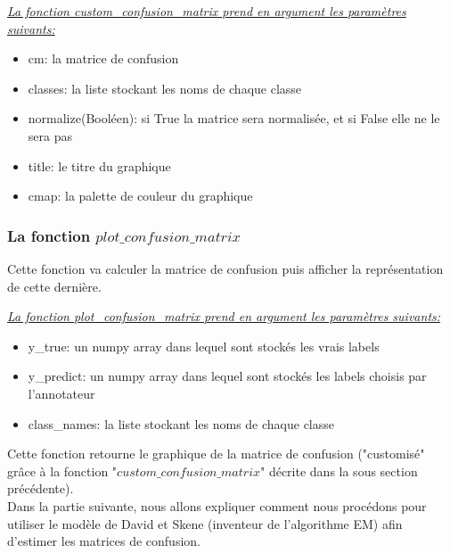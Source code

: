 \documentclass[a4paper,french,10pt]{article}
\begin{document}
	
	
	\textit{\underline{La fonction custom\_confusion\_matrix prend en argument les paramètres suivants:}}
	\vspace{2mm}
	\begin{itemize}
		\item cm: la matrice de confusion \\
		\item classes: la liste stockant les noms de chaque classe \\
		\item normalize(Booléen): si True la matrice sera normalisée, et si False elle ne le sera pas \\
		\item title: le titre du graphique \\
		\item cmap: la palette de couleur du graphique
	\end{itemize}

	\subsubsection{La fonction $plot\_confusion\_matrix$}
	
	Cette fonction va calculer la matrice de confusion puis afficher la représentation de cette dernière.
	
	
	
	\textit{\underline{La fonction plot\_confusion\_matrix prend en argument les paramètres suivants:}}
		\vspace{2mm}
		\begin{itemize}
		\item y\_true: un numpy array dans lequel sont stockés les vrais labels \\
		\item y\_predict: un numpy array dans lequel sont stockés les labels choisis par l'annotateur \\
		\item class\_names: la liste stockant les noms de chaque classe
	\end{itemize}

	\vspace{2mm}

	Cette fonction retourne le graphique de la matrice de confusion ("customisé" grâce à la fonction "$custom\_confusion\_matrix$" décrite dans la sous section précédente). \\
	Dans la partie suivante, nous allons expliquer comment nous procédons pour utiliser le modèle de David et Skene (inventeur de l'algorithme EM) afin d'estimer les matrices de confusion.
	
\end{document}
